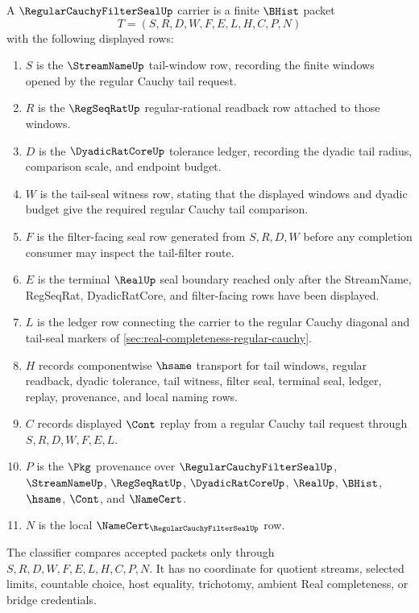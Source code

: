 \begin{definition}
\label{def:regular-cauchy-filter-seal-carrier}
A $\RegularCauchyFilterSealUp$ carrier is a finite $\BHist$ packet
$$
T=(S,R,D,W,F,E,L,H,C,P,N)
$$
with the following displayed rows:
\begin{enumerate}
\item $S$ is the $\StreamNameUp$ tail-window row, recording the finite windows opened by the regular Cauchy tail request.
\item $R$ is the $\RegSeqRatUp$ regular-rational readback row attached to those windows.
\item $D$ is the $\DyadicRatCoreUp$ tolerance ledger, recording the dyadic tail radius, comparison scale, and endpoint budget.
\item $W$ is the tail-seal witness row, stating that the displayed windows and dyadic budget give the required regular Cauchy tail comparison.
\item $F$ is the filter-facing seal row generated from $S,R,D,W$ before any completion consumer may inspect the tail-filter route.
\item $E$ is the terminal $\RealUp$ seal boundary reached only after the StreamName, RegSeqRat, DyadicRatCore, and filter-facing rows have been displayed.
\item $L$ is the ledger row connecting the carrier to the regular Cauchy diagonal and tail-seal markers of \autoref{sec:real-completeness-regular-cauchy}.
\item $H$ records componentwise $\hsame$ transport for tail windows, regular readback, dyadic tolerance, tail witness, filter seal, terminal seal, ledger, replay, provenance, and local naming rows.
\item $C$ records displayed $\Cont$ replay from a regular Cauchy tail request through $S,R,D,W,F,E,L$.
\item $P$ is the $\Pkg$ provenance over $\RegularCauchyFilterSealUp$, $\StreamNameUp$, $\RegSeqRatUp$, $\DyadicRatCoreUp$, $\RealUp$, $\BHist$, $\hsame$, $\Cont$, and $\NameCert$.
\item $N$ is the local $\NameCert_{\RegularCauchyFilterSealUp}$ row.
\end{enumerate}
The classifier compares accepted packets only through $S,R,D,W,F,E,L,H,C,P,N$. It has no coordinate for quotient streams, selected limits, countable choice, host equality, trichotomy, ambient Real completeness, or bridge credentials.
\end{definition}

